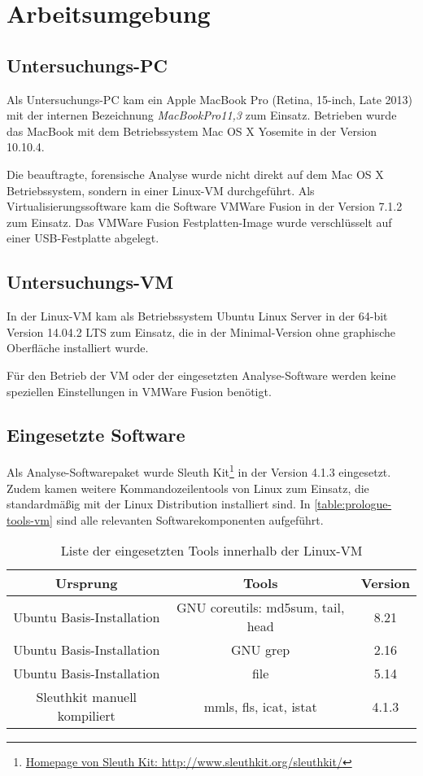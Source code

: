 \section{Arbeitsumgebung}
\label{sec:env}

\subsection{Untersuchungs-PC}
Als Untersuchungs-PC kam ein Apple MacBook Pro (Retina, 15-inch, Late 2013) mit der  internen Bezeichnung \textit{MacBookPro11,3} zum Einsatz. Betrieben wurde das MacBook mit dem Betriebssystem Mac OS X Yosemite in der Version 10.10.4.

Die beauftragte, forensische Analyse wurde nicht direkt auf dem Mac OS X Betriebssystem, sondern in einer Linux-VM durchgeführt. Als Virtualisierungssoftware kam die Software VMWare Fusion in der Version 7.1.2 zum Einsatz. Das VMWare Fusion Festplatten-Image wurde verschlüsselt auf einer USB-Festplatte abgelegt.

\subsection{Untersuchungs-VM}

In der Linux-VM kam als Betriebssystem Ubuntu Linux Server in der 64-bit Version 14.04.2 LTS zum Einsatz, die in der Minimal-Version ohne graphische Oberfläche installiert wurde. 

Für den Betrieb der VM oder der eingesetzten Analyse-Software werden keine speziellen Einstellungen in VMWare Fusion benötigt.

\subsection{Eingesetzte Software}

Als Analyse-Softwarepaket wurde Sleuth Kit\footnote{\href{http://www.sleuthkit.org/sleuthkit/}{Homepage von Sleuth Kit: http://www.sleuthkit.org/sleuthkit/}} in der Version 4.1.3 eingesetzt. Zudem kamen weitere Kommandozeilentools von Linux zum Einsatz, die standardmäßig mit der Linux Distribution installiert sind. In \autoref{table:prologue-tools-vm} sind alle relevanten Softwarekomponenten aufgeführt.

\begin{table}[H]
\centering
\begin{tabular}{ccc}
\toprule
Ursprung & Tools & Version \\ 
\midrule
Ubuntu Basis-Installation & GNU coreutils: md5sum, tail, head & 8.21 \\ 
Ubuntu Basis-Installation & GNU grep & 2.16 \\ 
Ubuntu Basis-Installation & file & 5.14 \\ 
Sleuthkit manuell kompiliert & mmls, fls, icat, istat & 4.1.3 \\ 
\bottomrule
\end{tabular} 
\caption{Liste der eingesetzten Tools innerhalb der Linux-VM}
\label{table:prologue-tools-vm}
\end{table}

